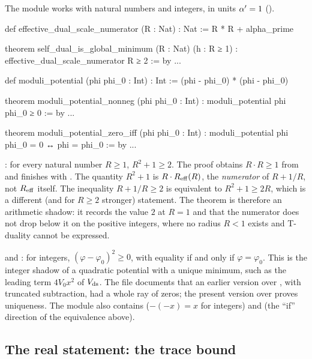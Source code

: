 The module  works with natural
numbers and integers, in units $\alpha'=1$ ().
\begin{leancode}
def effective_dual_scale_numerator (R : Nat) : Nat :=
  R * R + alpha_prime

theorem self_dual_is_global_minimum (R : Nat) (h : R ≥ 1) :
    effective_dual_scale_numerator R ≥ 2 := by ...

def moduli_potential (phi phi_0 : Int) : Int :=
  (phi - phi_0) * (phi - phi_0)

theorem moduli_potential_nonneg (phi phi_0 : Int) :
    moduli_potential phi phi_0 ≥ 0 := by ...

theorem moduli_potential_zero_iff (phi phi_0 : Int) :
    moduli_potential phi phi_0 = 0 ↔ phi = phi_0 := by ...
\end{leancode}
\begin{leanbox}
: for every natural number $R\ge1$, $R^2+1\ge2$. The
proof obtains $R\cdot R\ge1$ from  and finishes with . The
quantity $R^2+1$ is $R\cdot R_{\rm eff}(R)$, the \emph{numerator} of $R+1/R$, not
$R_{\rm eff}$ itself. The inequality $R+1/R\ge2$ is equivalent to $R^2+1\ge2R$, which is a
different (and for $R\ge2$ stronger) statement. The theorem is therefore an arithmetic shadow:
it records the value $2$ at $R=1$ and that the numerator does not drop below it on the
positive integers, where no radius $R<1$ exists and T-duality cannot be expressed.

 and : for integers,
$(\varphi-\varphi_0)^2\ge0$, with equality if and only if $\varphi=\varphi_0$. This is the
integer shadow of a quadratic potential with a unique minimum, such as the leading term
$4V_0x^2$ of $V_{\rm ds}$. The file documents that an earlier version over , with
truncated subtraction, had a whole ray of zeros; the present version over  proves
uniqueness. The module also contains  ($-(-x)=x$ for integers)
and  (the ``if'' direction of the equivalence above).
\end{leanbox}

\subsection{The real statement: the trace bound}

